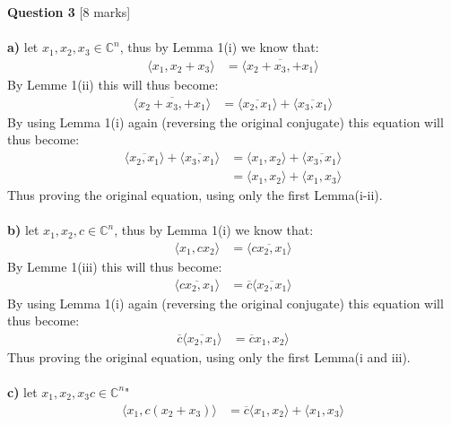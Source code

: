 \documentclass[11pt]{article}
\begin{document}
\textbf{Question 3} [8 marks] \\\\
\textbf{a)} let $x_1, x_2, x_3 \in \mathbb{C}^n$, thus by Lemma 1(i) we know that:
\begin{align*}
\langle x_1, x_2 + x_3  \rangle &= \langle \overline{x_2 + x_3, + x_1}  \rangle
\end{align*}
By Lemme 1(ii) this will thus become:
\begin{align*}
\langle \overline{x_2 + x_3, + x_1}  \rangle &= \langle \overline{x_2, x_1}  \rangle + \langle \overline{x_3,  x_1}  \rangle
\end{align*}
By using Lemma 1(i) again (reversing the original conjugate) this equation will thus become:
\begin{align*}
\langle \overline{x_2, x_1}  \rangle + \langle \overline{x_3, x_1}  \rangle &= \langle x_1, x_2  \rangle + \langle \overline{x_3,  x_1}  \rangle \\
&= \langle x_1, x_2  \rangle + \langle x_1, x_3  \rangle
\end{align*}
Thus proving the original equation, using only the first Lemma(i-ii).\\\\
\textbf{b)} let $x_1, x_2, c \in \mathbb{C}^n$, thus by Lemma 1(i) we know that:
\begin{align*}
\langle x_1, cx_2  \rangle &= \langle \overline{cx_2, x_1}  \rangle
\end{align*}
By Lemme 1(iii) this will thus become:
\begin{align*}
\langle \overline{cx_2, x_1}  \rangle &= \overline{c} \langle \overline{x_2, x_1}  \rangle
\end{align*}
By using Lemma 1(i) again (reversing the original conjugate) this equation will thus become:
\begin{align*}
\overline{c} \langle \overline{x_2, x_1}  \rangle &= \overline{c} x_1, x_2 \rangle
\end{align*}
Thus proving the original equation, using only the first Lemma(i and iii).\\\\
\textbf{c)} let $x_1, x_2, x_3 c \in \mathbb{C}^n$"
\begin{align*}
\langle x_1, c(x_2 +x_3)  \rangle &= \overline{c} \langle x_1, x_2  \rangle + \langle x_1, x_3  \rangle
\end{align*}
\end{document}
